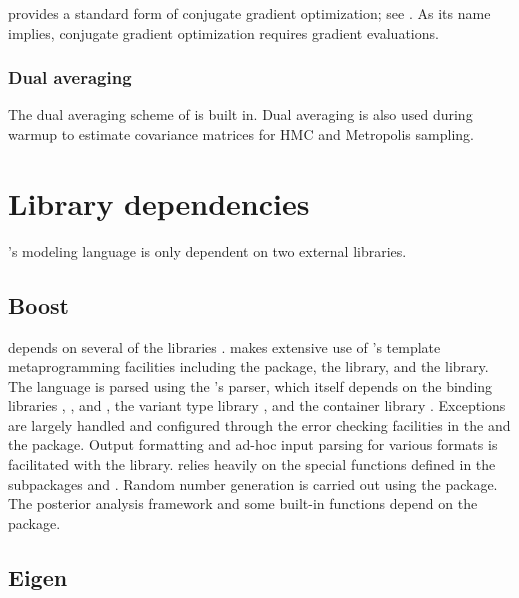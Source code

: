 \documentclass[article]{jss}
\begin{document}
 provides a standard form of conjugate gradient
optimization; see \citep{NocedalWright:2006}.  As its name implies,
conjugate gradient optimization requires gradient evaluations.

\subsubsection{Dual averaging}

The dual averaging scheme of \cite{Nesterov:2009} is built in.  Dual
averaging is also used during warmup to estimate covariance matrices
for HMC and Metropolis sampling.


\section{Library dependencies}

's modeling language is only dependent on two external
libraries.  

\subsection{Boost} 

 depends on several of the  
libraries \citep{Boost:2011}.   makes extensive use of
's template metaprogramming facilities including the
 package, the  library, and the
 library.  The  language is parsed
using the 's  parser, which itself depends on
the binding libraries , , and ,
the variant type library , and the container library
.  Exceptions are largely handled and configured through
the error checking facilities in the  and the
 package.  Output formatting and ad-hoc input parsing
for various formats is facilitated with the  library.
 relies heavily on the special functions defined in the
 subpackages  and .  Random number generation is carried out using the
 package.  The posterior analysis framework and some
built-in functions depend on the  package.

\subsection{Eigen}
\end{document}
